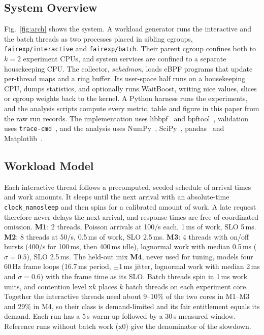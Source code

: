 \documentclass[conference]{IEEEtran}
\newcommand{\ms}{\,ms}
\begin{document}
\subsection{System Overview}
Fig.~\ref{fig:arch} shows the system. A workload generator runs the interactive and the batch threads as two processes placed in sibling cgroups, \texttt{fairexp/interactive} and \texttt{fairexp/batch}. Their parent cgroup confines both to $k=2$ experiment CPUs, and system services are confined to a separate housekeeping CPU. The collector, \emph{schedmon}, loads eBPF programs that update per-thread maps and a ring buffer. Its user-space half runs on a housekeeping CPU, dumps statistics, and optionally runs WaitBoost, writing nice values, slices or cgroup weights back to the kernel. A Python harness runs the experiments, and the analysis scripts compute every metric, table and figure in this paper from the raw run records. The implementation uses libbpf~\cite{libbpf} and bpftool~\cite{bpftool}, validation uses \texttt{trace-cmd}~\cite{tracecmd}, and the analysis uses NumPy~\cite{numpy}, SciPy~\cite{scipy}, pandas~\cite{pandas} and Matplotlib~\cite{matplotlib}.

\subsection{Workload Model}
Each interactive thread follows a precomputed, seeded schedule of arrival times and work amounts. It sleeps until the next arrival with an absolute-time \texttt{clock\_nanosleep} and then spins for a calibrated amount of work. A late request therefore never delays the next arrival, and response times are free of coordinated omission. \textbf{M1}: 2 threads, Poisson arrivals at 100/s each, 1\ms{} of work, SLO 5\ms. \textbf{M2}: 8 threads at 50/s, 0.5\ms{} of work, SLO 2.5\ms. \textbf{M3}: 4 threads with on/off bursts (400/s for 100\ms, then 400\ms{} idle), lognormal work with median 0.5\ms{} ($\sigma=0.5$), SLO 2.5\ms. The held-out mix \textbf{M4}, never used for tuning, models four 60\,Hz frame loops (16.7\ms{} period, $\pm$1\ms{} jitter, lognormal work with median 2\ms{} and $\sigma=0.6$) with the frame time as its SLO. Batch threads spin in 1\ms{} work units, and contention level x$k$ places $k$ batch threads on each experiment core. Together the interactive threads need about 9--10\% of the two cores in M1--M3 and 29\% in M4, so their class is demand-limited and its fair entitlement equals its demand. Each run has a 5\,s warm-up followed by a 30\,s measured window. Reference runs without batch work (x0) give the denominator of the slowdown.
\end{document}
